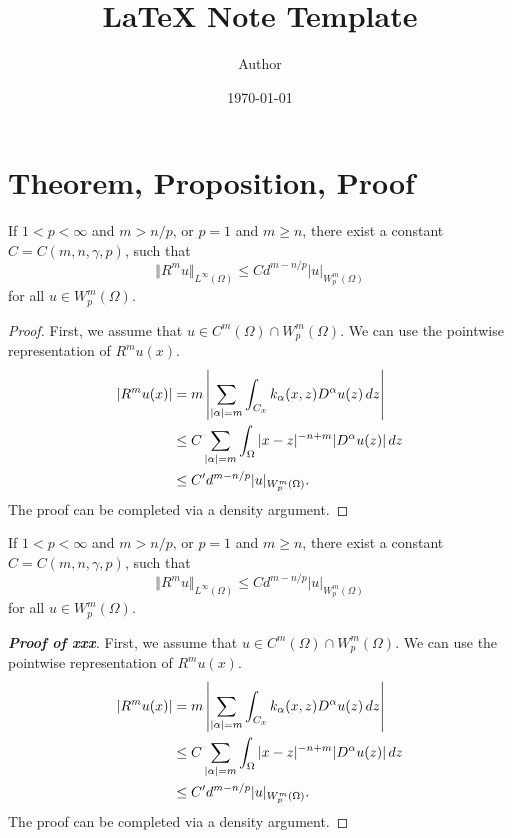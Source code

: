 \documentclass{article}
\title{\LaTeX{} Note Template}
\author{Author}
\date{\today}
\begin{document}
\maketitle

\section{Theorem, Proposition, Proof}

\begin{theorem}
    If $1<p<\infty$ and $m > n/p$, or $p=1$ and $m \ge n$, there exist a constant $C = C(m,n,\gamma,p)$, such that
    \begin{equation*}
        \Vert R^m u \Vert_{L^\infty(\Omega)} \le C d^{m-n/p} |u|_{W^m_p(\Omega)}
    \end{equation*}
    for all $u \in W^m_p(\Omega)$.
\end{theorem}
\begin{proof}
    First, we assume that $u \in C^m(\Omega) \cap W^m_p(\Omega)$. We can use the pointwise representation of $R^mu(x)$.
    \begin{align*}
        |R^mu(x)| ={} & m \left| \sum_{|\alpha| = m} \int_{C_x} k_{\alpha}(x,z) D^\alpha u(z)\,dz \right| \notag \\
        \le{}         & C \sum_{|\alpha|=m} \int_{\Omega} |x-z|^{-n+m} |D^\alpha u(z)|\,dz \notag                \\
        \le{}         & C' d^{m-n/p} |u|_{W^m_p(\Omega)}.
    \end{align*}
    The proof can be completed via a density argument.
\end{proof}

\begin{theorem}[xxx]
    If $1<p<\infty$ and $m > n/p$, or $p=1$ and $m \ge n$, there exist a constant $C = C(m,n,\gamma,p)$, such that
    \begin{equation*}
        \Vert R^m u \Vert_{L^\infty(\Omega)} \le C d^{m-n/p} |u|_{W^m_p(\Omega)}
    \end{equation*}
    for all $u \in W^m_p(\Omega)$.
\end{theorem}
\begin{proof}[\upshape\bfseries Proof of xxx]
    First, we assume that $u \in C^m(\Omega) \cap W^m_p(\Omega)$. We can use the pointwise representation of $R^mu(x)$.
    \begin{align*}
        |R^mu(x)| ={} & m \left| \sum_{|\alpha| = m} \int_{C_x} k_{\alpha}(x,z) D^\alpha u(z)\,dz \right| \notag \\
        \le{}         & C \sum_{|\alpha|=m} \int_{\Omega} |x-z|^{-n+m} |D^\alpha u(z)|\,dz \notag                \\
        \le{}         & C' d^{m-n/p} |u|_{W^m_p(\Omega)}.
    \end{align*}
    The proof can be completed via a density argument.
\end{proof}
\end{document}
